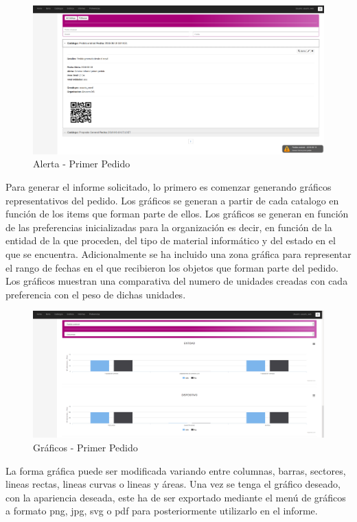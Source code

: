\documentclass[a4paper,11pt]{book}
\begin{document}
\begin{figure}[H] 
\centering 
\includegraphics[scale=0.2]{imagenes/pruebas/alerta.png}
\caption{ Alerta - Primer Pedido\cite{propio}}
\end{figure}

Para generar el informe solicitado, lo primero es comenzar generando gráficos representativos del pedido. Los gráficos se generan a partir de cada catalogo en función de los items que forman parte de ellos. Los gráficos se generan en función de las preferencias inicializadas para la organización es decir, en función de la entidad de la que proceden, del tipo de material informático y del estado en el que se encuentra. Adicionalmente se ha incluido una zona gráfica para representar el rango de fechas en el que recibieron los objetos que forman parte del pedido. Los gráficos muestran una comparativa del numero de unidades creadas con cada preferencia con el peso de dichas unidades. 

\begin{figure}[H] 
\centering 
\includegraphics[scale=0.2]{imagenes/pruebas/g.png}
\caption{ Gráficos - Primer Pedido\cite{propio}}
\end{figure}

La forma gráfica puede ser modificada variando entre columnas, barras, sectores, lineas rectas, lineas curvas o lineas y áreas. Una vez se tenga el gráfico deseado, con la apariencia deseada,  este ha de ser exportado mediante el menú de gráficos a formato png, jpg, svg o pdf para posteriormente utilizarlo en el informe. 
\end{document}
